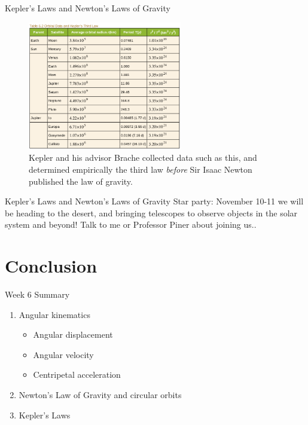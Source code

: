 \documentclass{beamer}
\begin{document}
\begin{frame}{Kepler's Laws and Newton's Laws of Gravity}
\begin{figure}
\centering
\includegraphics[width=0.6\textwidth]{figures/keplertable.png}
\caption{\label{fig:kepler3} Kepler and his advisor Brache collected data such as this, and determined empirically the third law \textit{before} Sir Isaac Newton published the law of gravity.}
\end{figure}
\end{frame}

\begin{frame}{Kepler's Laws and Newton's Laws of Gravity}
\alert{Star party}: November 10-11 we will be heading to the desert, and bringing telescopes to observe objects in the solar system and beyond!  Talk to me or Professor Piner about joining us..
\end{frame}

\section{Conclusion}

\begin{frame}{Week 6 Summary}
\begin{enumerate}
\item \alert{Angular} kinematics
\begin{itemize}
\item Angular displacement
\item Angular velocity
\item Centripetal acceleration
\end{itemize}
\item \alert{Newton's Law of Gravity} and circular orbits
\item Kepler's Laws
\end{enumerate}
\end{frame}
\end{document}
